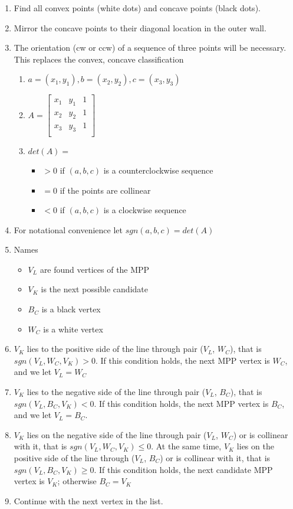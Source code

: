 \begin{enumerate}
\item Find all convex points (white dots) and concave points (black dots).
\item Mirror the concave points to their diagonal location in the outer wall.
\item The orientation (cw or ccw) of a sequence of three points will be necessary. This replaces the convex, concave classification
\begin{enumerate}
\item $a=(x_1, y_1), b=(x_2, y_2), c=(x_3, y_3)$
\item $A=\begin{bmatrix}
	x_1 & y_1 & 1\\
  	x_2 & y_2 & 1\\
  	x_3 & y_3 & 1\\
\end{bmatrix}$
\item $det(A) =$
\begin{itemize}
\item $> 0$ if $(a, b, c)$ is a counterclockwise sequence
\item $= 0$ if the points are collinear
\item $< 0$ if $(a, b, c)$ is a clockwise sequence
\end{itemize}
\end{enumerate}
\item For notational convenience let $sgn(a,b,c) = det(A)$
\item Names
\begin{itemize}
\item $V_L$ are found vertices of the MPP
\item $V_K$ is the next possible candidate
\item $B_C$ is a black vertex
\item $W_C$ is a white vertex
\end{itemize}
\item $V_K$ lies to the positive side of the line through pair ($V_L$, $W_C$), that is $sgn(V_L, W_C, V_K)>0$. If this condition holds, the next MPP vertex is $W_C$, and we let $V_L = W_C$
\item $V_K$ lies to the negative side of the line through pair ($V_L$, $B_C$), that is $sgn(V_L, B_C, V_K)<0$. If this condition holds, the next MPP vertex is $B_C$, and we let $V_L = B_C$.
\item $V_K$ lies on the negative side of the line through pair ($V_L$, $W_C$) or is collinear with it, that is $sgn(V_L, W_C, V_K) \le 0$. At the same time, $V_K$ lies on the positive side of the line through ($V_L$, $B_C$) or is collinear with it, that is $sgn(V_L, B_C, V_K) \ge 0$. If this condition holds, the next candidate MPP vertex is $V_K$; otherwise $B_C = V_K$
\item Continue with the next vertex in the list.
\end{enumerate}


